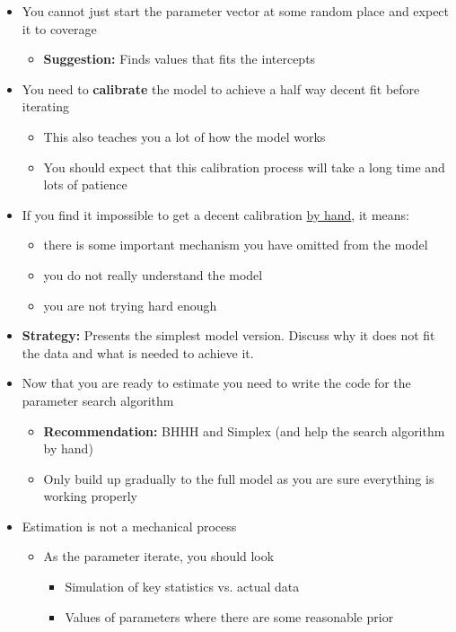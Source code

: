 \documentclass[11pt]{article}
\begin{document}
\begin{itemize}
\item You cannot just start the parameter vector at some random place and expect it to coverage
\begin{itemize}
\item \textbf{Suggestion:} Finds values that fits the intercepts
\end{itemize}
\item You need to \textbf{calibrate} the model to achieve a half way decent fit before iterating
\begin{itemize}
\item This also teaches you a lot of how the model works
\item You should expect that this calibration process will take a long time and lots of patience
\end{itemize}
\item If you find it impossible to get a decent calibration \uline{by hand}, it means:
\begin{itemize}
\item there is some important mechanism you have omitted from the model
\item you do not really understand the model
\item you are not trying hard enough
\end{itemize}
\item \textbf{Strategy:} Presents the simplest model version. Discuss why it does not fit the data and what is needed to achieve it.
\item Now that you are ready to estimate you need to write the code for the parameter search algorithm
\begin{itemize}
\item \textbf{Recommendation:} BHHH and Simplex (and help the search algorithm by hand)
\item Only build up gradually to the full model as you are sure everything is working properly
\end{itemize}
\item Estimation is not a mechanical process
\begin{itemize}
\item As the parameter iterate, you should look
\begin{itemize}
\item Simulation of key statistics vs. actual data
\item Values of parameters where there are some reasonable prior
\end{itemize}

\end{itemize}
\end{itemize}
\end{document}
